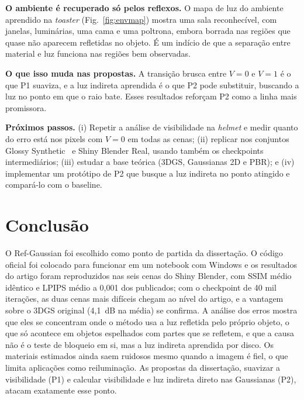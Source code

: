 \documentclass[conference]{IEEEtran}
\begin{document}
\textbf{O ambiente é recuperado só pelos reflexos.} O mapa de luz do ambiente aprendido na \textit{toaster} (Fig.~\ref{fig:envmap}) mostra uma sala reconhecível, com janelas, luminárias, uma cama e uma poltrona, embora borrada nas regiões que quase não aparecem refletidas no objeto. É um indício de que a separação entre material e luz funciona nas regiões bem observadas.

\textbf{O que isso muda nas propostas.} A transição brusca entre $V=0$ e $V=1$ é o que P1 suaviza, e a luz indireta aprendida é o que P2 pode substituir, buscando a luz no ponto em que o raio bate. Esses resultados reforçam P2 como a linha mais promissora.

\textbf{Próximos passos.} (i) Repetir a análise de visibilidade na \textit{helmet} e medir quanto do erro está nos pixels com $V=0$ em todas as cenas; (ii) replicar nos conjuntos Glossy Synthetic~\cite{liu2023nero} e Shiny Blender Real, usando também os checkpoints intermediários; (iii) estudar a base teórica (3DGS, Gaussianas 2D e PBR); e (iv) implementar um protótipo de P2 que busque a luz indireta no ponto atingido e compará-lo com o baseline.

\section{Conclusão}

O Ref-Gaussian foi escolhido como ponto de partida da dissertação. O código oficial foi colocado para funcionar em um notebook com Windows e os resultados do artigo foram reproduzidos nas seis cenas do Shiny Blender, com SSIM médio idêntico e LPIPS médio a 0,001 dos publicados; com o checkpoint de 40 mil iterações, as duas cenas mais difíceis chegam ao nível do artigo, e a vantagem sobre o 3DGS original (4,1~dB na média) se confirma. A análise dos erros mostra que eles se concentram onde o método usa a luz refletida pelo próprio objeto, o que só acontece em objetos espelhados com partes que se refletem, e que a causa não é o teste de bloqueio em si, mas a luz indireta aprendida por disco. Os materiais estimados ainda saem ruidosos mesmo quando a imagem é fiel, o que limita aplicações como reiluminação. As propostas da dissertação, suavizar a visibilidade (P1) e calcular visibilidade e luz indireta direto nas Gaussianas (P2), atacam exatamente esse ponto.
\end{document}
